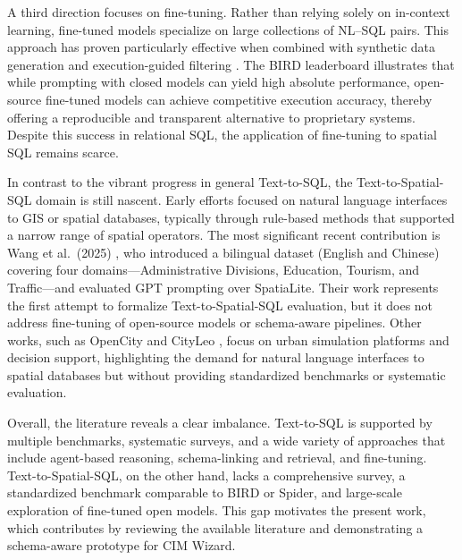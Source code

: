 A third direction focuses on fine-tuning. Rather than relying solely on in-context learning, fine-tuned models specialize on large collections of NL–SQL pairs. This approach has proven particularly effective when combined with synthetic data generation and execution-guided filtering \cite{omnisql,refsql,sqlfuse,grafix_t5}. The BIRD leaderboard illustrates that while prompting with closed models can yield high absolute performance, open-source fine-tuned models can achieve competitive execution accuracy, thereby offering a reproducible and transparent alternative to proprietary systems. Despite this success in relational SQL, the application of fine-tuning to spatial SQL remains scarce.

In contrast to the vibrant progress in general Text-to-SQL, the Text-to-Spatial-SQL domain is still nascent. Early efforts focused on natural language interfaces to GIS or spatial databases, typically through rule-based methods that supported a narrow range of spatial operators. The most significant recent contribution is Wang et al.\ (2025) \cite{wang_spatial_ijgi}, who introduced a bilingual dataset (English and Chinese) covering four domains—Administrative Divisions, Education, Tourism, and Traffic—and evaluated GPT prompting over SpatiaLite. Their work represents the first attempt to formalize Text-to-Spatial-SQL evaluation, but it does not address fine-tuning of open-source models or schema-aware pipelines. Other works, such as OpenCity \cite{opencity} and CityLeo \cite{cityleo}, focus on urban simulation platforms and decision support, highlighting the demand for natural language interfaces to spatial databases but without providing standardized benchmarks or systematic evaluation.

Overall, the literature reveals a clear imbalance. Text-to-SQL is supported by multiple benchmarks, systematic surveys, and a wide variety of approaches that include agent-based reasoning, schema-linking and retrieval, and fine-tuning. Text-to-Spatial-SQL, on the other hand, lacks a comprehensive survey, a standardized benchmark comparable to BIRD or Spider, and large-scale exploration of fine-tuned open models. This gap motivates the present work, which contributes by reviewing the available literature and demonstrating a schema-aware prototype for CIM Wizard.